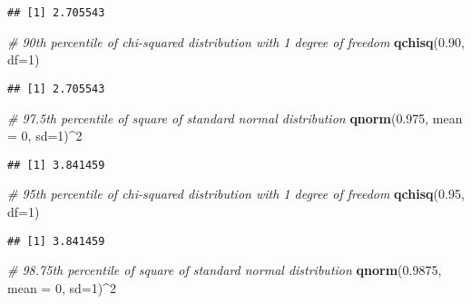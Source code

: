 \documentclass[
]{article}
\newenvironment{Shaded}{\begin{snugshade}}{\end{snugshade}}
\newcommand{\AttributeTok}[1]{\textcolor[rgb]{0.13,0.29,0.53}{#1}}
\newcommand{\CommentTok}[1]{\textcolor[rgb]{0.56,0.35,0.01}{\textit{#1}}}
\newcommand{\DecValTok}[1]{\textcolor[rgb]{0.00,0.00,0.81}{#1}}
\newcommand{\FloatTok}[1]{\textcolor[rgb]{0.00,0.00,0.81}{#1}}
\newcommand{\FunctionTok}[1]{\textcolor[rgb]{0.13,0.29,0.53}{\textbf{#1}}}
\newcommand{\NormalTok}[1]{#1}
\newcommand{\SpecialCharTok}[1]{\textcolor[rgb]{0.81,0.36,0.00}{\textbf{#1}}}
\begin{document}
\begin{verbatim}
## [1] 2.705543
\end{verbatim}

\begin{Shaded}
\begin{Highlighting}[]
\CommentTok{\# 90th percentile of chi{-}squared distribution with 1 degree of freedom}
\FunctionTok{qchisq}\NormalTok{(}\FloatTok{0.90}\NormalTok{, }\AttributeTok{df=}\DecValTok{1}\NormalTok{)}
\end{Highlighting}
\end{Shaded}

\begin{verbatim}
## [1] 2.705543
\end{verbatim}

\begin{Shaded}
\begin{Highlighting}[]
\CommentTok{\# 97.5th percentile of square of standard normal distribution}
\FunctionTok{qnorm}\NormalTok{(}\FloatTok{0.975}\NormalTok{, }\AttributeTok{mean =} \DecValTok{0}\NormalTok{, }\AttributeTok{sd=}\DecValTok{1}\NormalTok{)}\SpecialCharTok{\^{}}\DecValTok{2}
\end{Highlighting}
\end{Shaded}

\begin{verbatim}
## [1] 3.841459
\end{verbatim}

\begin{Shaded}
\begin{Highlighting}[]
\CommentTok{\# 95th percentile of chi{-}squared distribution with 1 degree of freedom}
\FunctionTok{qchisq}\NormalTok{(}\FloatTok{0.95}\NormalTok{, }\AttributeTok{df=}\DecValTok{1}\NormalTok{)}
\end{Highlighting}
\end{Shaded}

\begin{verbatim}
## [1] 3.841459
\end{verbatim}

\begin{Shaded}
\begin{Highlighting}[]
\CommentTok{\# 98.75th percentile of square of standard normal distribution}
\FunctionTok{qnorm}\NormalTok{(}\FloatTok{0.9875}\NormalTok{, }\AttributeTok{mean =} \DecValTok{0}\NormalTok{, }\AttributeTok{sd=}\DecValTok{1}\NormalTok{)}\SpecialCharTok{\^{}}\DecValTok{2}
\end{Highlighting}
\end{Shaded}
\end{document}
